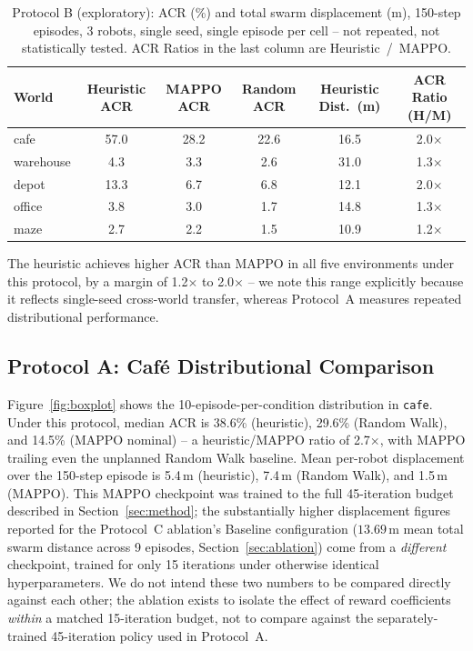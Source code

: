 \documentclass[11pt]{article}
\begin{document}
\begin{table}[h]
\centering
\small
\setlength{\tabcolsep}{4pt}
\caption{Protocol B (exploratory): ACR (\%) and total swarm displacement (m), 150-step episodes, 3 robots, single seed, single episode per cell -- not repeated, not statistically tested. ACR Ratios in the last column are Heuristic~/~MAPPO.}
\label{tab:5world}
\begin{tabular}{lccccc}
\toprule
World & Heuristic ACR & MAPPO ACR & Random ACR & Heuristic Dist.\ (m) & ACR Ratio (H/M) \\
\midrule
cafe      & 57.0 & 28.2 & 22.6 & 16.5 & 2.0$\times$ \\
warehouse & 4.3  & 3.3  & 2.6  & 31.0 & 1.3$\times$ \\
depot     & 13.3 & 6.7  & 6.8  & 12.1 & 2.0$\times$ \\
office    & 3.8  & 3.0  & 1.7  & 14.8 & 1.3$\times$ \\
maze      & 2.7  & 2.2  & 1.5  & 10.9 & 1.2$\times$ \\
\bottomrule
\end{tabular}
\end{table}

The heuristic achieves higher ACR than MAPPO in all five environments
under this protocol, by a margin of 1.2$\times$ to 2.0$\times$ -- we note
this range explicitly because it reflects single-seed cross-world transfer,
whereas Protocol~A measures repeated distributional performance.

\subsection{Protocol A: Caf\'e Distributional Comparison}
Figure~\ref{fig:boxplot} shows the 10-episode-per-condition distribution
in \texttt{cafe}. Under this protocol, median ACR is 38.6\% (heuristic),
29.6\% (Random Walk), and 14.5\% (MAPPO nominal) -- a heuristic/MAPPO
ratio of 2.7$\times$, with MAPPO trailing even the unplanned Random Walk
baseline. Mean per-robot displacement over the 150-step episode is
5.4\,m (heuristic), 7.4\,m (Random Walk), and 1.5\,m (MAPPO). This MAPPO
checkpoint was trained to the full 45-iteration budget described in
Section~\ref{sec:method}; the substantially higher displacement figures
reported for the Protocol~C ablation's Baseline configuration
($13.69\,$m mean total swarm distance across 9 episodes,
Section~\ref{sec:ablation}) come from a
\emph{different} checkpoint, trained for only 15 iterations under
otherwise identical hyperparameters. We do not intend these two numbers
to be compared directly against each other; the ablation exists to
isolate the effect of reward coefficients \emph{within} a matched
15-iteration budget, not to compare against the separately-trained
45-iteration policy used in Protocol~A.
\end{document}
